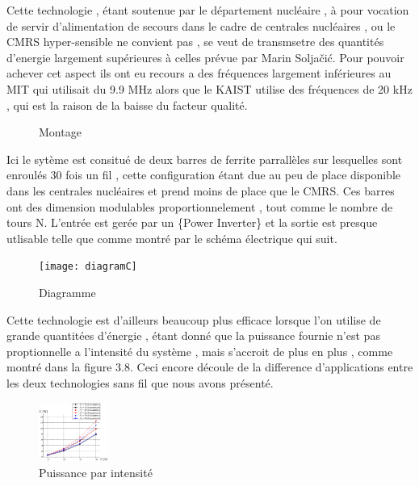 \documentclass[12pt]{report}
\begin{document}
  Cette technologie , étant soutenue par le département nucléaire , à pour vocation de servir d'alimentation de secours dans le cadre de centrales nucléaires , ou le CMRS hyper-sensible ne convient pas , se veut de transmsetre des quantités d'energie largement supérieures à celles prévue par Marin Soljačić. Pour pouvoir achever cet aspect ils ont eu recours a des fréquences largement inférieures au MIT qui utilisait du 9.9 MHz alors que le KAIST utilise des fréquences de 20 kHz , qui est la raison de la baisse du facteur qualité.
  
\begin{figure}
  \begin{center}
    \setlength\fboxsep{0pt}
    \setlength\fboxrule{0.5pt}
  \end{center}
  \caption{Montage}
\end{figure}Ici le sytème est consitué de deux barres de ferrite parrallèles sur lesquelles sont enroulés 30 fois un fil , cette configuration étant due au peu de place disponible dans les centrales nucléaires et prend moins de place que le CMRS. Ces barres ont des dimension modulables proportionnelement , tout comme le nombre de tours N. L'entrée est gerée par un \{Power Inverter\} et la sortie est presque utlisable telle que comme montré par le schéma électrique qui suit.
\begin{figure}
  \begin{center}
    \texttt{[image: diagramC]}
  \end{center}
  \caption{Diagramme}
\end{figure}

  Cette technologie est d'ailleurs beaucoup plus efficace lorsque l'on utilise de grande quantitées d'énergie , étant donné que la puissance fournie n'est pas proptionnelle a l'intensité du système , mais s'accroit de plus en plus , comme montré dans la figure 3.8. Ceci encore découle de la difference d'applications entre les deux technologies sans fil que nous avons présenté.
\begin{figure}
  \begin{center}
    \includegraphics[width=0.2\textwidth]{PparI}
  \end{center}
  \caption{Puissance par intensité}
\end{figure}
\end{document}
